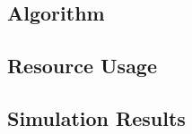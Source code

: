 \documentclass{article}
\begin{document}

\subsection{Algorithm}


\subsection{Resource Usage}


\subsection{Simulation Results}

\end{document}

